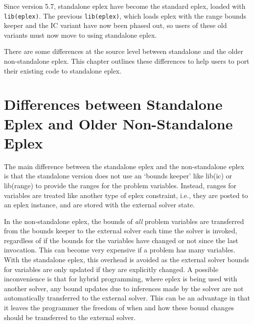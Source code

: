 %
% 
% 
% 
% 

Since {\eclipse} version 5.7, standalone eplex have become the standard
eplex, loaded with \verb'lib(eplex)'. The previous \verb'lib(eplex)', which
loads eplex with the range bounds keeper and the IC variant have now been
phased out, so users of these old variants must now move
to using standalone eplex.

There are some differences at the source level between standalone and the
older non-standalone eplex. This chapter outlines these differences to help
users to port their existing code to standalone eplex.

\section{Differences between Standalone Eplex and Older Non-Standalone Eplex}

The main difference between the standalone eplex and the non-standalone
eplex is that the standalone version does not use an {\eclipse}
`bounds keeper' like lib(ic) or lib(range) to provide the ranges for the
problem variables. Instead, ranges for variables are treated like another
type of eplex constraint, i.e., they are posted to an eplex instance, and
are stored with the external solver state.

In the non-standalone eplex, the bounds of {\it all} problem variables are
transferred from the bounds keeper to the external solver each time the
solver is invoked, regardless of if the bounds for the variables have
changed or not since the last invocation. This can become very expensive if
a problem has many variables. With the standalone eplex, this overhead is
avoided as the external solver bounds for variables are only updated if
they are explicitly changed. A possible inconvenience is that for hybrid
programming, where eplex is being used with another {\eclipse} solver, any
bound updates due to inferences made by the {\eclipse} solver are not
automatically transferred to the external solver. This can be an advantage
in that it leaves the programmer the freedom of when and how these bound
changes should be transferred to the external solver.

